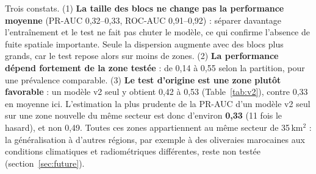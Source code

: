 \documentclass[10pt,a4paper,twocolumn]{article}
\begin{document}
Trois constats. (1) \textbf{La taille des blocs ne change pas la performance moyenne} (PR-AUC 0,32--0,33, ROC-AUC 0,91--0,92) :
séparer davantage l'entraînement et le test ne fait pas chuter le modèle, ce qui confirme l'absence de fuite spatiale
importante. Seule la dispersion augmente avec des blocs plus grands, car le test repose alors sur moins de zones.
(2) \textbf{La performance dépend fortement de la zone testée} : de 0,14 à 0,55 selon la partition, pour une prévalence
comparable. (3) \textbf{Le test d'origine est une zone plutôt favorable} : un modèle v2 seul y obtient 0,42 à 0,53 (Table~\ref{tab:v2}),
contre 0,33 en moyenne ici. L'estimation la plus prudente de la PR-AUC d'un modèle v2 seul sur une zone nouvelle du même
secteur est donc d'environ \textbf{0,33} (11 fois le hasard), et non 0,49. Toutes ces zones appartiennent au même secteur
de 35\,km$^2$ : la généralisation à d'autres régions, par exemple à des oliveraies marocaines aux conditions climatiques et
radiométriques différentes, reste non testée (section~\ref{sec:future}).
\end{document}
